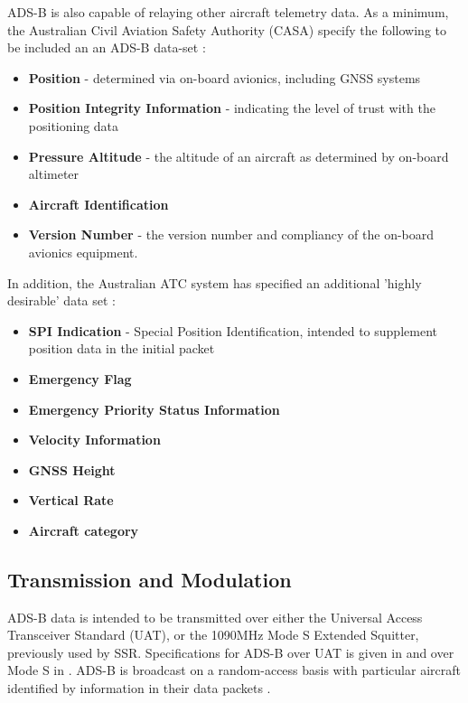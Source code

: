 ADS-B is also capable of relaying other aircraft telemetry data. As a minimum, the Australian Civil Aviation Safety Authority (CASA) specify the following to be included an an ADS-B data-set  \cite[Clause 8.2.3]{ADSB_AC_specs}:
\begin{itemize}
	\item \textbf{Position} - determined via on-board avionics, including GNSS systems
	\item\textbf{Position Integrity Information} - indicating the level of trust with the positioning data
	\item \textbf{Pressure Altitude} - the altitude of an aircraft as determined by on-board altimeter
	\item \textbf{Aircraft Identification}
	\item \textbf{Version Number} - the version number and compliancy of the on-board avionics equipment.
\end{itemize}
In addition, the Australian ATC system has specified an additional 'highly desirable' data set \cite[Clause 8.2.4]{ADSB_AC_specs}:
\begin{itemize}
	\item \textbf{SPI Indication} - Special Position Identification, intended to supplement position data in the initial packet
	\item \textbf{Emergency Flag}
	\item \textbf{Emergency Priority Status Information}
	\item \textbf{Velocity Information}
	\item \textbf{GNSS Height}
	\item \textbf{Vertical Rate}
	\item \textbf{Aircraft category}
\end{itemize}


\subsection{Transmission and Modulation}
ADS-B data is intended to be transmitted over either the Universal Access Transceiver Standard (UAT), or the 1090MHz Mode S Extended Squitter, previously used by SSR. Specifications for ADS-B over UAT is given in \cite{RTCA_UAT} and over Mode S in \cite{RTCA_MODE_S}. ADS-B is broadcast on a random-access basis with particular aircraft identified by information in their data packets \cite{Blomenhofer2012}.

